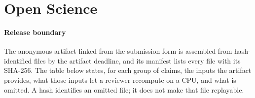 
\section*{Open Science}

\paragraph{Release boundary}
The anonymous artifact linked from the submission form is assembled from
hash-identified files by the artifact deadline, and its manifest lists every
file with its SHA-256. The table below states, for each group of claims, the
inputs the artifact provides, what those inputs let a reviewer recompute on a
CPU, and what is omitted. A hash identifies an omitted file; it does not make
that file replayable.

